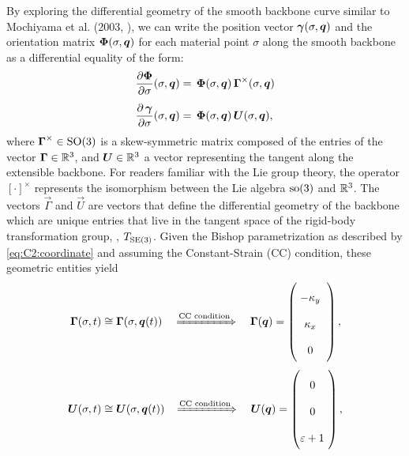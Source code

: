 By exploring the differential geometry of the smooth backbone curve similar to Mochiyama et al. (2003, \cite{Mochiyama2003}), we can write the position vector ${\boldsymbol{\gamma}}(\sigma,{\boldsymbol{q}})$ and the orientation matrix ${\boldsymbol{\Phi}}(\sigma,{\boldsymbol{q}})$ for each material point $\sigma$ along the smooth backbone as a differential equality of the form:
%
\begin{align}
\renewcommand*{\arraystretch}{2}{}
\frac{\partial \,\!\mat{\Phi}}{\partial \sigma}(\sigma,\q) & = \, \mat{\Phi}(\sigma,\vec{q}) \,\mat{\Gamma}^{\times} (\sigma,\q) \label{eq:C2:change_phi} \\[0.45em]
%
\frac{\partial \, \gammaB}{\partial \sigma}(\sigma,\q) & = \, \mat{\Phi}(\sigma,\vec{q}) \, \vec{U}(\sigma,\q), \label{eq:C2:change_p}
\end{align}
%
where $\boldsymbol{\Gamma}^\times \in \textup{\textrm{SO}}(3)$ is a skew-symmetric matrix composed of the entries of the vector $\boldsymbol{\Gamma} \in \mathbb{R}^3$, and $\boldsymbol{U}\in \mathbb{R}^3$ a vector representing the tangent along the extensible backbone. For readers familiar with the Lie group theory, the operator $[\cdot]^\times$ represents the isomorphism between the Lie algebra $\textup{\textrm{so}}(3)$ and $\mathbb{R}^3$. The vectors $\vec{\Gamma}$ and $\vec{U}$ are vectors that define the differential geometry of the backbone
\cite{Mochiyama2003} which are unique entries that live in the tangent space of the rigid-body transformation group, \ie, $T_{\textup{\textrm{SE}}(3)}$. Given the Bishop parametrization as described by \eqref{eq:C2:coordinate} and assuming the Constant-Strain (CC) condition, these geometric entities yield
%
\begin{align}
\vec{\Gamma}(\sigma,t) & \cong \vec{\Gamma}(\sigma,\q(t)) \quad \xRightarrow[]{\textrm{CC condition}}\quad \vec{\Gamma}(\q) = \begin{pmatrix} \;-\kappa_y\;\; \\ \;\kappa_x\;\; \\ \;0\;\;  \end{pmatrix}, \\[0.35em]
%
\vec{U}(\sigma,t) & \cong \vec{U}(\sigma,\q(t)) \!\quad \xRightarrow[]{\textrm{CC condition}} \quad \vec{U}(\q) =  \begin{pmatrix} \;0\;\;  \\  \;0\;\; \\ \varepsilon + 1\ \end{pmatrix},
\end{align}
%
